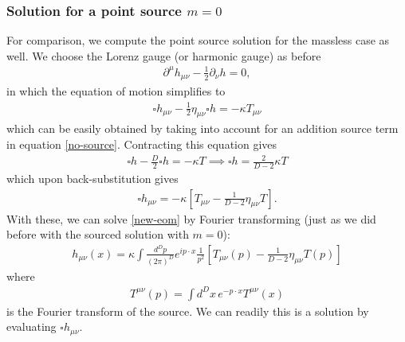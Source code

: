 \documentclass{book}
\theoremstyle{definition}
\newcommand{\p}{\partial}
\newcommand{\f}[2]{\frac{#1}{#2}}
\newcommand{\lb}{\left[}
\newcommand{\rb}{\right]}
\begin{document}
\subsubsection{Solution for a point source $m = 0$}
For comparison, we compute the point source solution for the massless case as well. We choose the Lorenz gauge (or harmonic gauge) as before
\begin{align}
\p^\mu h_{\mu\nu} - \f{1}{2}\p_\nu h = 0,
\end{align} 
in which the equation of motion simplifies to 
\begin{align}\label{new-eom}
\square h_{\mu\nu} - \f{1}{2}\eta_{\mu\nu}\square h = -\kappa T_{\mu\nu}
\end{align}
which can be easily obtained by taking into account for an addition source term in equation \eqref{no-source}. Contracting this equation gives
\begin{align}
\square h - \f{D}{2}\square h = -\kappa T\implies \square h = \f{2}{D-2}\kappa T
\end{align}
which upon back-substitution gives
\begin{align}
\square h_{\mu\nu} = -\kappa \lb T_{\mu\nu} - \f{1}{D-2}\eta_{\mu\nu}T \rb.
\end{align}
With these, we can solve \eqref{new-eom} by Fourier transforming (just as we did before with the sourced solution with $m=0$):
\begin{align}\label{new-soln}
\boxed{h_{\mu\nu}(x) = \kappa \int \f{d^Dp}{(2\pi)^D} e^{ip\cdot x}\f{1}{p^2}\lb T_{\mu\nu}(p) - \f{1}{D-2}\eta_{\mu\nu}T(p) \rb}
\end{align}         
where
\begin{align}
T^{\mu\nu}(p) = \int d^Dx\, e^{-p\cdot x}T^{\mu\nu}(x) 
\end{align}
is the Fourier transform of the source. We can readily this is a solution by evaluating $\square h_{\mu\nu}$. \\
\end{document}
